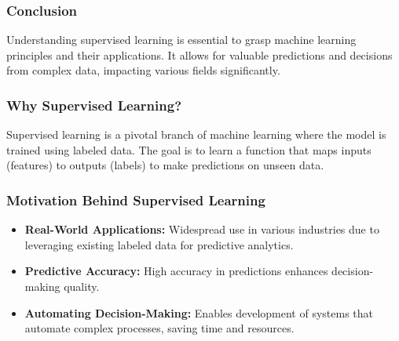 \documentclass[aspectratio=169]{beamer}
\begin{document}
\begin{frame}[fragile]
    \frametitle{Conclusion}
    Understanding supervised learning is essential to grasp machine learning principles and their applications. It allows for valuable predictions and decisions from complex data, impacting various fields significantly.
\end{frame}

\begin{frame}[fragile]
    \frametitle{Why Supervised Learning?}
    Supervised learning is a pivotal branch of machine learning where the model is trained using labeled data. The goal is to learn a function that maps inputs (features) to outputs (labels) to make predictions on unseen data.
\end{frame}

\begin{frame}[fragile]
    \frametitle{Motivation Behind Supervised Learning}
    \begin{itemize}
        \item \textbf{Real-World Applications:} 
            Widespread use in various industries due to leveraging existing labeled data for predictive analytics.
        \item \textbf{Predictive Accuracy:} 
            High accuracy in predictions enhances decision-making quality.
        \item \textbf{Automating Decision-Making:} 
            Enables development of systems that automate complex processes, saving time and resources.
    \end{itemize}
\end{frame}
\end{document}
